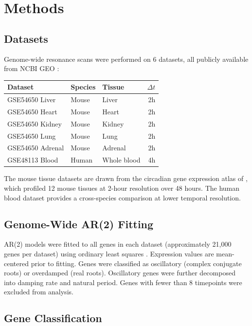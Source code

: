 \documentclass[11pt,letterpaper]{article}
\begin{document}
\section{Methods}

\subsection{Datasets}

Genome-wide resonance scans were performed on 6 datasets, all publicly available from NCBI GEO \citep{barrett2013ncbi}:

\begin{center}
\begin{tabular}{lllr}
\toprule
\textbf{Dataset} & \textbf{Species} & \textbf{Tissue} & \textbf{$\Delta t$} \\
\midrule
GSE54650 Liver & Mouse & Liver & 2h \\
GSE54650 Heart & Mouse & Heart & 2h \\
GSE54650 Kidney & Mouse & Kidney & 2h \\
GSE54650 Lung & Mouse & Lung & 2h \\
GSE54650 Adrenal & Mouse & Adrenal & 2h \\
GSE48113 Blood & Human & Whole blood & 4h \\
\bottomrule
\end{tabular}
\end{center}

The mouse tissue datasets are drawn from the circadian gene expression atlas of \citet{zhang2014circadian}, which profiled 12 mouse tissues at 2-hour resolution over 48 hours. The human blood dataset \citep{archer2014mistimed} provides a cross-species comparison at lower temporal resolution.

\subsection{Genome-Wide AR(2) Fitting}

AR(2) models were fitted to all genes in each dataset (approximately 21,000 genes per dataset) using ordinary least squares \citep{hamilton1994time, box2015time}. Expression values are mean-centered prior to fitting. Genes were classified as oscillatory (complex conjugate roots) or overdamped (real roots). Oscillatory genes were further decomposed into damping rate and natural period. Genes with fewer than 8 timepoints were excluded from analysis.

\subsection{Gene Classification}
\end{document}
